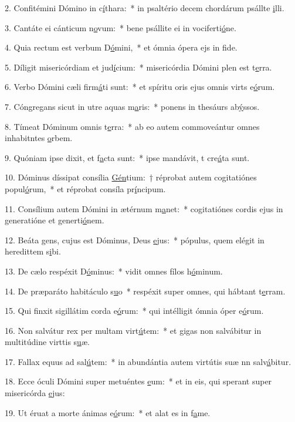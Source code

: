 2. Confitémini Dómino in c\uline{í}thara:~* in psaltério decem chordárum psállte \uline{i}lli.\par 
3. Cantáte ei cánticum n\uline{o}vum:~* bene psállite ei in vociferti\uline{ó}ne.\par 
4. Quia rectum est verbum D\uline{ó}mini,~* et ómnia ópera ejs in f\uline{i}de.\par 
5. Díligit misericórdiam et jud\uline{í}cium:~* misericórdia Dómini plen est t\uline{e}rra.\par 
6. Verbo Dómini cæli firm\uline{á}ti sunt:~* et spíritu oris ejus omnis virts e\uline{ó}rum.\par 
7. Cóngregans sicut in utre aquas m\uline{a}ris:~* ponens in thesáurs ab\uline{ý}ssos.\par 
8. Tímeat Dóminum omnis t\uline{e}rra:~* ab eo autem commoveántur omnes inhabitntes \uline{o}rbem.\par 
9. Quóniam ipse dixit, et f\uline{a}cta sunt:~* ipse mandávit, t cre\uline{á}ta sunt.\par 
10. Dóminus díssipat consília \uline{Gén}tium:~† réprobat autem cogitatiónes popul\uline{ó}rum,~* et réprobat consíla pr\uline{í}ncipum.\par 
11. Consílium autem Dómini in ætérnum m\uline{a}net:~* cogitatiónes cordis ejus in generatióne et generti\uline{ó}nem.\par 
12. Beáta gens, cujus est Dóminus, Deus \uline{e}jus:~* pópulus, quem elégit in heredittem s\uline{i}bi.\par 
13. De cælo respéxit D\uline{ó}minus:~* vidit omnes fílos h\uline{ó}minum.\par 
14. De præparáto habitáculo s\uline{u}o~* respéxit super omnes, qui hábtant t\uline{e}rram.\par 
15. Qui finxit sigillátim corda e\uline{ó}rum:~* qui intélligit ómnia óper e\uline{ó}rum.\par 
16. Non salvátur rex per multam virt\uline{ú}tem:~* et gigas non salvábitur in multitúdine virttis s\uline{u}æ.\par 
17. Fallax equus ad sal\uline{ú}tem:~* in abundántia autem virtútis suæ nn salv\uline{á}bitur.\par 
18. Ecce óculi Dómini super metuéntes \uline{e}um:~* et in eis, qui sperant super misericórda \uline{e}jus:\par 
19. Ut éruat a morte ánimas e\uline{ó}rum:~* et alat es in f\uline{a}me.\par 
